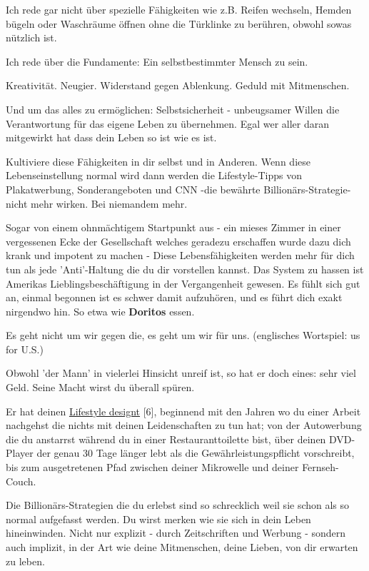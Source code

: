 \documentclass[10pt,a4paper,ngerman,twoside]{article} %
\begin{document}
\begin{multicols}{3}
Ich rede gar nicht über spezielle Fähigkeiten wie z.B. Reifen wechseln, Hemden bügeln oder Waschräume öffnen ohne die Türklinke zu berühren, obwohl sowas nützlich ist.

Ich rede über die Fundamente: Ein selbstbestimmter Mensch zu sein.

Kreativität. Neugier. Widerstand gegen Ablenkung. Geduld mit Mitmenschen.

Und um das alles zu ermöglichen: Selbstsicherheit - unbeugsamer Willen die Verantwortung für das eigene Leben zu übernehmen. Egal wer aller daran mitgewirkt hat dass dein Leben so ist wie es ist.

Kultiviere diese Fähigkeiten in dir selbst und in Anderen. Wenn diese Lebenseinstellung normal wird dann werden die Lifestyle-Tipps von Plakatwerbung, Sonderangeboten und CNN -die bewährte Billionärs-Strategie- nicht mehr wirken. Bei niemandem mehr.

Sogar von einem ohnmächtigem Startpunkt aus - ein mieses Zimmer in einer vergessenen Ecke der Gesellschaft welches geradezu erschaffen wurde dazu dich krank und impotent zu machen - Diese Lebensfähigkeiten werden mehr für dich tun als jede 'Anti'-Haltung die du dir vorstellen kannst. Das System zu hassen ist Amerikas Lieblingsbeschäftigung in der Vergangenheit gewesen. Es fühlt sich gut an, einmal begonnen ist es schwer damit aufzuhören, und es führt dich exakt nirgendwo hin. So etwa wie \textbf{Doritos} essen.

Es geht nicht um wir gegen die, es geht um wir für uns. (englisches Wortspiel: us for U.S.)

Obwohl 'der Mann' in vielerlei Hinsicht unreif ist, so hat er doch eines: sehr viel Geld. Seine Macht wirst du überall spüren. 


Er hat deinen \href{http://www.raptitude.com/2010/07/your-lifestyle-has-already-been-designed/}{Lifestyle designt}  [6], beginnend mit den Jahren wo du einer Arbeit nachgehst die nichts mit deinen Leidenschaften zu tun hat; von der Autowerbung die du anstarrst während du in einer Restauranttoilette bist, über deinen DVD-Player der genau 30 Tage länger lebt als die  Gewährleistungspflicht vorschreibt, bis zum ausgetretenen Pfad zwischen deiner Mikrowelle und deiner Fernseh-Couch.


Die Billionärs-Strategien die du erlebst sind so schrecklich weil sie schon als so normal aufgefasst werden. Du wirst merken wie sie sich in dein Leben hineinwinden. Nicht nur explizit - durch Zeitschriften und Werbung - sondern auch implizit, in der Art wie deine Mitmenschen, deine Lieben, von dir erwarten zu leben.


\end{multicols}
\end{document}
